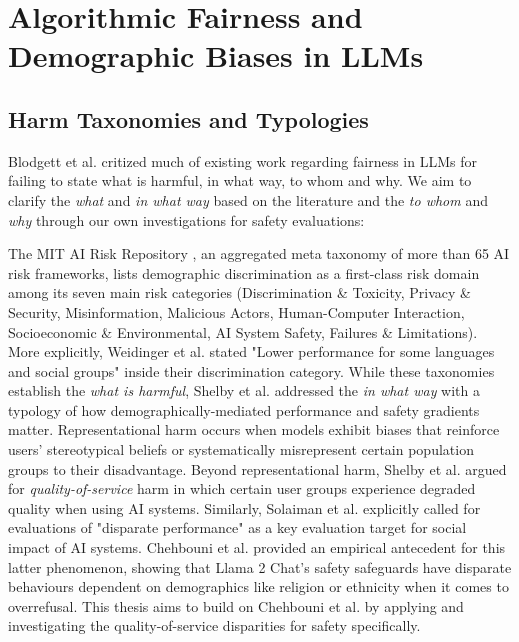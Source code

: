 \section{Algorithmic Fairness and Demographic Biases in LLMs}


\subsection{Harm Taxonomies and Typologies}

Blodgett et al.  \cite{blodgett-etal-2020-language} critized much of existing work regarding fairness in LLMs for failing to state what is harmful, in what way, to whom and why. We aim to clarify the \textit{what} and \textit{in what way} based on the literature and the \textit{to whom} and \textit{why} through our own investigations for safety evaluations:

The MIT AI Risk Repository \cite{slattery2024airisk}, an aggregated meta taxonomy of more than 65 AI risk frameworks, lists demographic discrimination as a first-class risk domain among its seven main risk categories (Discrimination \& Toxicity, Privacy \& Security, Misinformation, Malicious Actors, Human-Computer Interaction, Socioeconomic \& Environmental, AI System Safety, Failures \& Limitations). More explicitly, Weidinger et al. \cite{weidinger2022taxonomy} stated "Lower performance for some languages and social groups" inside their discrimination category.
While these taxonomies establish the \textit{what is harmful}, Shelby et al. \cite{shelby2023sociotechnical} addressed the \textit{in what way} with a typology of how demographically-mediated performance and safety gradients matter. Representational harm occurs when models exhibit biases that reinforce users' stereotypical beliefs or systematically misrepresent certain population groups to their disadvantage. Beyond representational harm, Shelby et al. argued for \textit{quality-of-service} harm in which certain user groups experience degraded quality when using AI systems. Similarly, Solaiman et al. \cite{solaiman2023social} explicitly called for evaluations of "disparate performance" as a key evaluation target for social impact of AI systems. Chehbouni et al. \cite{chehbouni-etal-2024-representational} provided an empirical antecedent for this latter phenomenon, showing that Llama 2 Chat's safety safeguards have disparate behaviours dependent on demographics like religion or ethnicity when it comes to overrefusal.
This thesis aims to build on Chehbouni et al. by applying and investigating the quality-of-service disparities for safety specifically.

